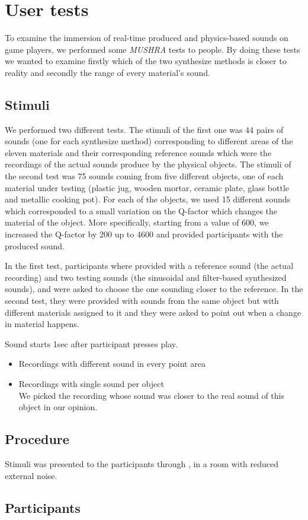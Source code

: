 \section{User tests}

To examine the immersion of real-time produced and physics-based sounds on game players, we performed some \textit{MUSHRA} tests to people. By doing these tests we wanted to examine firstly which of the two synthesize methods is closer to reality and secondly the range of every material's sound.

\subsection{Stimuli}
We performed two different tests. The stimuli of the first one was 44 pairs of sounds (one for each synthesize method) corresponding to different areas of the eleven materials and their corresponding reference sounds which were the recordings of the actual sounds produce by the physical objects. The stimuli of the second test was 75 sounds coming from five different objects, one of each material under testing (plastic jug, wooden mortar, ceramic plate, glass bottle and metallic cooking pot). For each of the objects, we used 15 different sounds which corresponded to a small variation on the Q-factor which changes the material of the object. More specifically, starting from a value of 600, we increased the Q-factor by 200 up to 4600  and provided participants with the produced sound.

In the first test, participants where provided with a reference sound (the actual recording) and two testing sounds (the sinusoidal and filter-based synthesized sounds), and were asked to choose the one sounding closer to the reference. In the second test, they were provided with sounds from the same object but with different materials assigned to it and they were asked to point out when a change in material happens. 

Sound starts 1sec after participant presses play.
\begin{itemize}
\item Recordings with different sound in every point area
\item Recordings with single sound per object\\
We picked the recording whose sound was closer to the real sound of this object in our opinion.\\

\end{itemize}

\subsection{Procedure}
Stimuli was presented to the participants through , in a room with reduced external noise.

\subsection{Participants}
